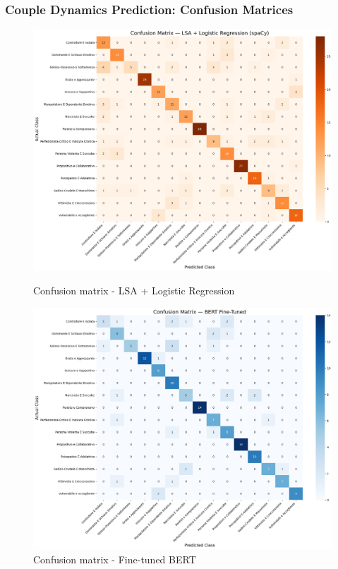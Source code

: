 \documentclass{beamer}
\begin{document}
\begin{frame}
\frametitle{Couple Dynamics Prediction: Confusion Matrices}

\begin{figure}
\centering
\begin{minipage}{0.5\textwidth}
\centering
\includegraphics[width=\linewidth]{figures/lsa_logreg_confusion_matrix.png}
\caption{Confusion matrix - LSA + Logistic Regression}
\end{minipage}%
\begin{minipage}{0.5\textwidth}
\centering
\includegraphics[width=\linewidth]{figures/bert_finetuned_confusion_matrix.png}
\caption{Confusion matrix - Fine-tuned BERT}
\end{minipage}
\end{figure}

\end{frame}
\end{document}
